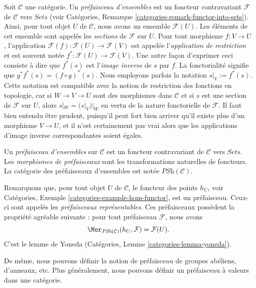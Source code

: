 \noindent
Soit $\mathcal{C}$ une catégorie.
Un {\it préfaisceau d’ensembles} est un foncteur contravariant $\mathcal{F}$
de $\mathcal{C}$ vers $\textit{Sets}$ (voir Catégories, Remarque
\ref{categories-remark-functor-into-sets}).
Ainsi, pour tout objet $U$ de $\mathcal{C}$, nous avons un ensemble
$\mathcal{F}(U)$. Les éléments de cet ensemble sont appelés
les {\it sections} de $\mathcal{F}$ sur $U$. Pour tout morphisme
$f : V \to U$, l’application $\mathcal{F}(f) : \mathcal{F}(U) \to \mathcal{F}(V)$
est appelée l’{\it application de restriction} et est souvent notée
$f^\ast : \mathcal{F}(U) \to \mathcal{F}(V)$. Une autre façon
d’exprimer ceci consiste à dire que $f^*(s)$ est l’{\it image inverse}
de $s$ par $f$. La fonctorialité signifie que $g^* f^* (s) = (f \circ g)^*(s)$.
Nous employons parfois la notation $s|_V := f^\ast(s)$.
Cette notation est compatible avec la notion de restriction
des fonctions en topologie, car si $W \to V \to U$
sont des morphismes dans $\mathcal{C}$ et si $s$ est une section de
$\mathcal{F}$ sur $U$, alors $s|_W = (s|_V)|_W$ en vertu de la
nature fonctorielle de $\mathcal{F}$. Il faut bien entendu être
prudent, puisqu’il peut fort bien arriver
qu’il existe plus d’un morphisme $V \to U$, et il n’est
certainement pas vrai alors que les applications d’image inverse
correspondantes soient égales.

\begin{definition}
\label{definition-presheaves-sets}
Un {\it préfaisceau d’ensembles} sur $\mathcal{C}$ est un foncteur
contravariant de $\mathcal{C}$ vers $\textit{Sets}$. Les {\it morphismes
de préfaisceaux} sont les transformations naturelles de foncteurs. La catégorie
des préfaisceaux d’ensembles est notée $\textit{PSh}(\mathcal{C})$.
\end{definition}

\noindent
Remarquons que, pour tout objet $U$ de $\mathcal{C}$, le foncteur des
points $h_U$, voir Catégories, Exemple \ref{categories-example-hom-functor},
est un préfaisceau. Ceux-ci sont appelés les {\it préfaisceaux représentables}.
Ces préfaisceaux possèdent la propriété agréable suivante : pour tout
préfaisceau $\mathcal{F}$, nous avons
\begin{equation}
\label{equation-map-representable-into-presheaf}
\Mor_{\textit{PSh}(\mathcal{C})}(h_U, \mathcal{F})
=
\mathcal{F}(U).
\end{equation}
C’est le lemme de Yoneda (Catégories, Lemme \ref{categories-lemma-yoneda}).

\medskip\noindent
De même, nous pouvons définir la notion de préfaisceau de groupes abéliens,
d’anneaux, etc. Plus généralement, nous pouvons définir un préfaisceau à valeurs
dans une catégorie.

